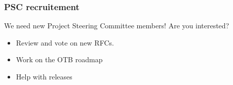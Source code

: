 \documentclass[smaller]{beamer}
\begin{document}
\begin{frame}
\frametitle{PSC recruitement}
We need new Project Steering Committee members! Are you interested?
\begin{itemize}
    \item Review and vote on new RFCs.
    \item Work on the OTB roadmap
    \item Help with releases
\end{itemize}
\end{frame}
\end{document}
